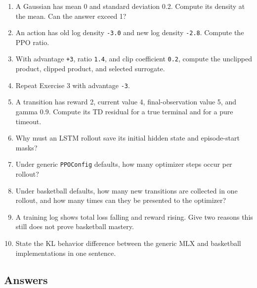 \documentclass[
  american,
  11pt,
  letterpaper,
]{article}
\providecommand{\tightlist}{%
  \setlength{\itemsep}{0pt}\setlength{\parskip}{0pt}}
\begin{document}
\begin{enumerate}
\def\labelenumi{\arabic{enumi}.}
\tightlist
\item
  A Gaussian has mean 0 and standard deviation 0.2. Compute its density
  at the mean. Can the answer exceed 1?
\item
  An action has old log density \texttt{-3.0} and new log density
  \texttt{-2.8}. Compute the PPO ratio.
\item
  With advantage \texttt{+3}, ratio \texttt{1.4}, and clip coefficient
  \texttt{0.2}, compute the unclipped product, clipped product, and
  selected surrogate.
\item
  Repeat Exercise 3 with advantage \texttt{-3}.
\item
  A transition has reward 2, current value 4, final-observation value 5,
  and gamma 0.9. Compute its TD residual for a true terminal and for a
  pure timeout.
\item
  Why must an LSTM rollout save its initial hidden state and
  episode-start masks?
\item
  Under generic \texttt{PPOConfig} defaults, how many optimizer steps
  occur per rollout?
\item
  Under basketball defaults, how many new transitions are collected in
  one rollout, and how many times can they be presented to the
  optimizer?
\item
  A training log shows total loss falling and reward rising. Give two
  reasons this still does not prove basketball mastery.
\item
  State the KL behavior difference between the generic MLX and
  basketball implementations in one sentence.
\end{enumerate}

\subsection{Answers}\label{answers}
\end{document}
